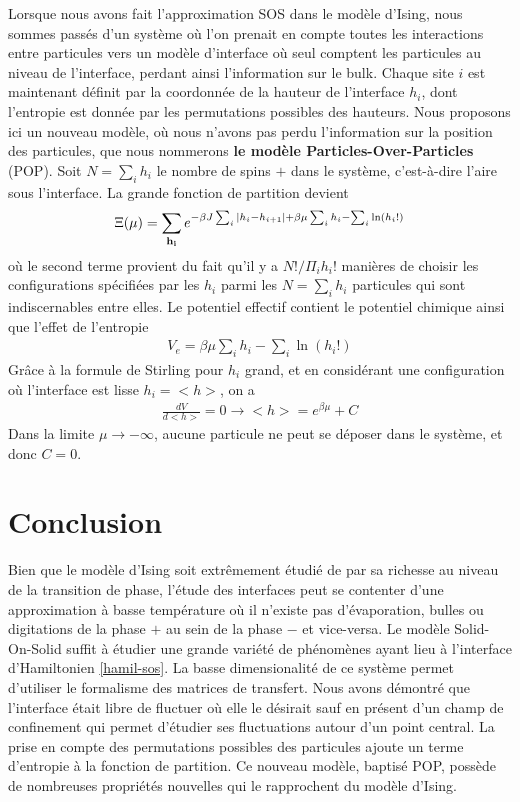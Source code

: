 Lorsque nous avons fait l'approximation SOS dans le modèle d'Ising, nous sommes passés d'un système où l'on prenait en compte toutes les interactions entre particules vers un modèle d'interface où seul comptent les particules au niveau de l'interface, perdant ainsi l'information sur le bulk. Chaque site $i$ est maintenant définit par la coordonnée de la hauteur de l'interface $h_i$, dont l'entropie est donnée par les permutations possibles des hauteurs.
Nous proposons ici un nouveau modèle, où nous n'avons pas perdu l'information sur la position des particules, que nous nommerons \textbf{le modèle Particles-Over-Particles} (POP). Soit $N = \sum_i h_i$ le nombre de spins $+$ dans le système, c'est-à-dire l'aire sous l'interface.
La grande fonction de partition devient
\begin{align}
    \Xi(\mu) = \sum_{{\bf h_i }} e^{- \beta J \sum_{i} |h_i-h_{i+1}| + \beta \mu \sum_i h_i  - \sum_i \ln(h_i !)} 
    \label{hamil-pop}
\end{align}
où le second terme provient du fait qu'il y a $N! / \Pi_i h_i! $ manières de choisir les configurations spécifiées par les $h_i$ parmi les $N = \sum_i h_i$ particules qui sont indiscernables entre elles. 
Le potentiel effectif contient le potentiel chimique ainsi que l'effet de l'entropie
\begin{align}
    V_e = \beta \mu \sum_i h_i - \sum_i \ln(h_i!)
\end{align}
Grâce à la formule de Stirling pour $h_i$ grand, et en considérant une configuration où l'interface est lisse $h_i = <h>$, on a
\begin{align}
    \frac{dV}{d<h>} = 0 \rightarrow <h> = e^{\beta \mu} + C
    \label{position-hauteur-pop}
\end{align}
Dans la limite $\mu \to -\infty$, aucune particule ne peut se déposer dans le système, et donc $C=0$.



\section{Conclusion}

Bien que le modèle d'Ising soit extrêmement étudié de par sa richesse au niveau de la transition de phase, l'étude des interfaces peut se contenter d'une approximation à basse température où il n'existe pas d'évaporation, bulles ou digitations de la phase $+$ au sein de la phase $-$ et vice-versa. Le modèle Solid-On-Solid suffit à étudier une grande variété de phénomènes ayant lieu à l'interface d'Hamiltonien \ref{hamil-sos}. 
La basse dimensionalité de ce système permet d'utiliser le formalisme des matrices de transfert. 
Nous avons démontré que l'interface était libre de fluctuer où elle le désirait sauf en présent d'un champ de confinement qui permet d'étudier ses fluctuations autour d'un point central.
La prise en compte des permutations possibles des particules ajoute un terme d'entropie à la fonction de partition. Ce nouveau modèle, baptisé POP, possède de nombreuses propriétés nouvelles qui le rapprochent du modèle d'Ising.

